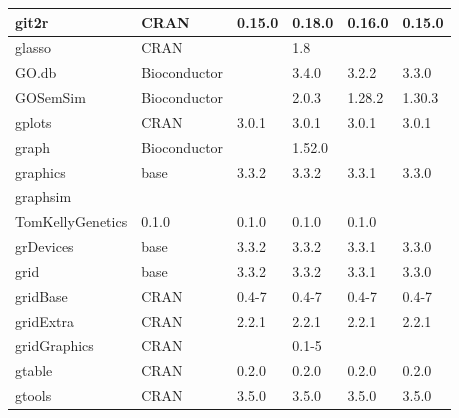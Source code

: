 \begin{longtable}{@{\extracolsep{\fill}}|l|l|l|l|l|l|@{}}
git2r                         & CRAN                      & 0.15.0      & 0.18.0      & 0.16.0         & 0.15.0           \\ \hline
glasso                        & CRAN                      &             & 1.8         &                &                  \\ \hline
GO.db                         & Bioconductor              &             & 3.4.0       & 3.2.2          & 3.3.0            \\ \hline
GOSemSim                      & Bioconductor              &             & 2.0.3       & 1.28.2         & 1.30.3           \\ \hline
gplots                        & CRAN                      & 3.0.1       & 3.0.1       & 3.0.1          & 3.0.1            \\ \hline
graph                         & Bioconductor              &             & 1.52.0      &                &                  \\ \hline
graphics                      & base                      & 3.3.2       & 3.3.2       & 3.3.1          & 3.3.0            \\ \hline
graphsim                      & \begin{tabular}[c]{@{}l@{}}GitHub \\ TomKellyGenetics \end{tabular}  & 0.1.0       & 0.1.0       & 0.1.0          & 0.1.0            \\ \hline
grDevices                     & base                      & 3.3.2       & 3.3.2       & 3.3.1          & 3.3.0            \\ \hline
grid                          & base                      & 3.3.2       & 3.3.2       & 3.3.1          & 3.3.0            \\ \hline
gridBase                      & CRAN                      & 0.4-7       & 0.4-7       & 0.4-7          & 0.4-7            \\ \hline
gridExtra                     & CRAN                      & 2.2.1       & 2.2.1       & 2.2.1          & 2.2.1            \\ \hline
gridGraphics                  & CRAN                      &             & 0.1-5       &                &                  \\ \hline
gtable                        & CRAN                      & 0.2.0       & 0.2.0       & 0.2.0          & 0.2.0            \\ \hline
gtools                        & CRAN                      & 3.5.0       & 3.5.0       & 3.5.0          & 3.5.0            \\ \hline

\end{longtable}
